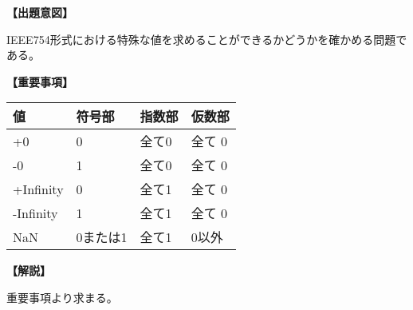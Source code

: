 \noindent \textbf{【出題意図】}

\noindent IEEE754形式における特殊な値を求めることができるかどうかを確かめる問題である。

\vspace{1em}
\noindent \textbf{【重要事項】}

\begin{center}
\begin{tabularx}{0.9\fbwidth}{|X|X|X|X|}
\hline
値 & 符号部 & 指数部 & 仮数部 \\
\hline
+0 & 0 & 全て0 & 全て 0 \\
\hline
-0 & 1 & 全て0 & 全て 0 \\
\hline
+Infinity & 0 & 全て1 & 全て 0 \\
\hline
-Infinity & 1 & 全て1 & 全て 0 \\
\hline
NaN & 0または1 & 全て1 & 0以外 \\
\hline
\end{tabularx}
\end{center}


\vspace{1em}
\noindent \textbf{【解説】}

\noindent 重要事項より求まる。
